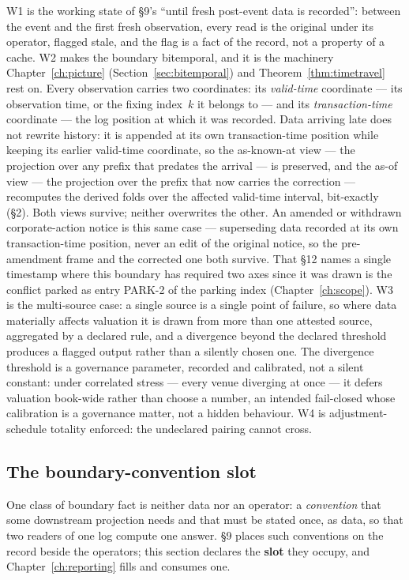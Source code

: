 \noindent W1 is the working state of \S 9's ``until fresh post-event data is recorded'':
between the event and the first fresh observation, every read is the original under its operator,
flagged stale, and the flag is a fact of the record, not a property of a cache. W2 makes the
boundary bitemporal, and it is the machinery Chapter~\ref{ch:picture}
(Section~\ref{sec:bitemporal}) and Theorem~\ref{thm:timetravel} rest on. Every observation
carries two coordinates: its \emph{valid-time} coordinate --- its observation time, or the
fixing index~$k$ it belongs to --- and its \emph{transaction-time} coordinate --- the log
position at which it was recorded. Data arriving late does not rewrite history: it is
appended at its own transaction-time position while keeping its earlier valid-time
coordinate, so the as-known-at view --- the projection over any prefix that predates the
arrival --- is preserved, and the as-of view --- the projection over the prefix that now
carries the correction --- recomputes the derived folds over the affected valid-time
interval, bit-exactly (\S 2). Both views survive; neither overwrites the other. An amended
or withdrawn corporate-action notice is this same case --- superseding data recorded at
its own transaction-time position, never an edit of the original notice, so the
pre-amendment frame and the corrected one both survive. That \S 12 names a single timestamp
where this boundary has required two axes since it was drawn is the conflict parked as entry
PARK-2 of the parking index (Chapter~\ref{ch:scope}). W3 is the
multi-source case: a single source is a single point of
failure, so where data materially affects valuation it is drawn from more than one
attested source, aggregated by a declared rule, and a divergence beyond the declared
threshold produces a flagged output rather than a silently chosen one. The divergence
threshold is a governance parameter, recorded and calibrated, not a silent constant: under
correlated stress --- every venue diverging at once --- it defers valuation book-wide rather
than choose a number, an intended fail-closed whose calibration is a governance matter, not a
hidden behaviour. W4 is
adjustment-schedule totality enforced: the undeclared pairing cannot cross.

\subsection{The boundary-convention slot}\label{sec:slot}

One class of boundary fact is neither data nor an operator: a \emph{convention} that
some downstream projection needs and that must be stated once, as data, so that two readers
of one log compute one answer. \S 9 places such conventions on the record beside the
operators; this section declares the \textbf{slot} they occupy, and
Chapter~\ref{ch:reporting} fills and consumes one.

